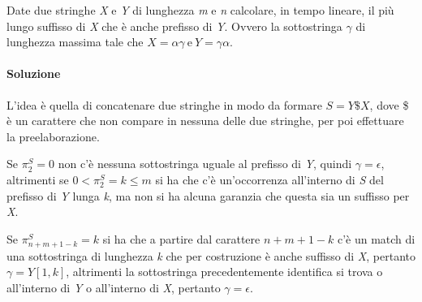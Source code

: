 Date due stringhe \textit{X} e \textit{Y} di lunghezza \textit{m} e \textit{n} calcolare, in tempo lineare, il più lungo suffisso di \textit{X} che è anche prefisso di \textit{Y}. 
Ovvero la sottostringa $ \gamma $ di lunghezza massima tale che $ X = \alpha\gamma \: \text{e} \: Y = \gamma\alpha$.

\paragraph{Soluzione}

L'idea è quella di concatenare due stringhe in modo da formare $ S= Y\$X $, dove \$ è un carattere che non compare in nessuna delle due stringhe, per poi effettuare la preelaborazione.

Se $ \pi_2^S = 0$ non c'è nessuna sottostringa uguale al prefisso di \textit{Y}, quindi $ \gamma = \epsilon $, altrimenti se  $ 0 < \pi_2^S = k \leq m$ si ha che c'è un'occorrenza all'interno di \textit{S} del prefisso di \textit{Y} lunga \textit{k}, ma non si ha alcuna garanzia che questa sia un suffisso per \textit{X}.

Se  $ \pi_{n+m+1-k}^S = k$ si ha che a partire dal carattere $ n+m+1-k $ c'è un match di una sottostringa di lunghezza \textit{k} che per costruzione è anche suffisso di \textit{X}, pertanto $ \gamma = Y[1,k] $, altrimenti la sottostringa precedentemente identifica si trova o all'interno di \textit{Y} o all'interno di \textit{X}, pertanto $ \gamma = \epsilon $.



